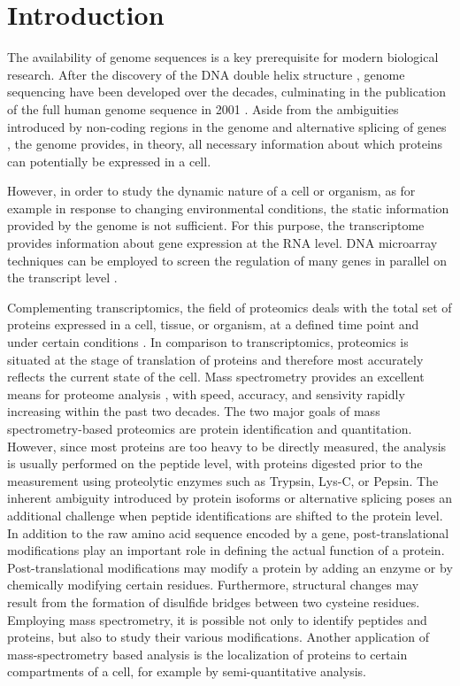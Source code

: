 \chapter{Introduction}

The availability of genome sequences is a key prerequisite for modern 
biological research.
After the discovery of the DNA double helix structure \citep{Watson1953},
genome sequencing have been developed over the decades, culminating in
the publication of the full human genome sequence in 2001 \citep{Venter2001}.
Aside from the ambiguities introduced by non-coding regions in the genome 
\citep{Gilbert1978} and alternative splicing of genes \citep{Black2003}, 
the genome provides, in theory, all necessary information about which proteins 
can potentially be expressed in a cell.

However, in order to study the dynamic nature of a cell or organism, as for 
example in response to changing environmental conditions, the static information
provided by the genome is not sufficient. 
For this purpose, the transcriptome provides information about gene expression
at the RNA level. 
DNA microarray techniques can be employed to screen the regulation of many
genes in parallel on the transcript level \citep{Schena1995}.

Complementing transcriptomics, the field of proteomics deals with the total
set of proteins expressed in a cell, tissue, or organism, at a defined time
point and under certain conditions \citep{Yarmush2002, Yates2009}.
In comparison to transcriptomics, proteomics is situated at the stage of 
translation of proteins and therefore most accurately reflects the current
state of the cell. 
Mass spectrometry provides an excellent means for proteome analysis
\citep{Aebersold2003}, with speed, accuracy, and sensivity rapidly increasing
within the past two decades.
The two major goals of mass spectrometry-based proteomics are protein 
identification and quantitation.
However, since most proteins are too heavy to be directly measured, the
analysis is usually performed on the peptide level, with proteins digested
prior to the measurement using proteolytic enzymes such as Trypsin, Lys-C, or 
Pepsin. 
The inherent ambiguity introduced by protein isoforms or alternative splicing
poses an additional challenge when peptide identifications are shifted to
the protein level.
In addition to the raw amino acid sequence encoded by a gene, post-translational
modifications play an important role in defining the actual function of a
protein.
Post-translational modifications may modify a protein by adding an enzyme or by
chemically modifying certain residues.
Furthermore, structural changes may result from the formation of disulfide 
bridges between two cysteine residues.
Employing mass spectrometry, it is possible not only to identify peptides and
proteins, but also to study their various modifications.
Another application of mass-spectrometry based analysis is the localization of
proteins to certain compartments of a cell, for example by semi-quantitative
analysis.


